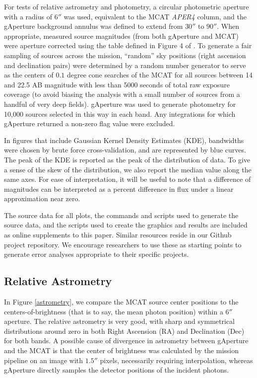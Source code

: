 \documentclass[iop]{emulateapj}
\begin{document}
For tests of relative astrometry and photometry, a circular photometric aperture with a radius of $6''$ was used, equivalent to the MCAT \emph{APER4} column, and the gAperture background annulus was defined to extend from $30''$ to $90''$. When appropriate, measured source magnitudes (from both gAperture and MCAT) were aperture corrected using the table defined in Figure 4 of \cite{mor2007}. To generate a fair sampling of sources across the mission, ``random''  sky positions (right ascension and declination pairs) were determined by a random number generator to serve as the centers of $0.1$ degree cone searches of the MCAT for all sources between 14 and 22.5 AB magnitude with less than 5000 seconds of total raw exposure coverage (to avoid biasing the analysis with a small number of sources from a handful of very deep fields). gAperture was used to generate photometry for 10,000 sources selected in this way in each band. Any integrations for which gAperture returned a non-zero flag value were excluded.

In figures that include Gaussian Kernel Density Estimates (KDE), bandwidths were chosen by brute force cross-validation, and are represented by blue curves. The peak of the KDE is reported as the peak of the distribution of data. To give a sense of the skew of the distribution, we also report the median value along the same axes. For ease of interpretation, it will be useful to note that a difference of magnitudes can be interpreted as a percent difference in flux under a linear approximation near zero.

The source data for all plots, the commands and scripts used to generate the source data, and the scripts used to create the graphics and results are included as online supplements to this paper. Similar resources reside in our Github project repository. We encourage researchers to use these as starting points to generate error analyses appropriate to their specific projects.

\subsection{Relative Astrometry}
In Figure \ref{astrometry}, we compare the MCAT source center positions to the centers-of-brightness (that is to say, the mean photon position) within a $6''$ aperture. The relative astrometry is very good, with sharp and symmetrical distributions around zero in both Right Ascension (RA) and Declination (Dec) for both bands. A possible cause of divergence in astrometry between gAperture and the MCAT is that the center of brightness was calculated by the mission pipeline on an image with $1.5''$ pixels, necessarily requiring interpolation, whereas gAperture directly samples the detector positions of the incident photons.
\end{document}
